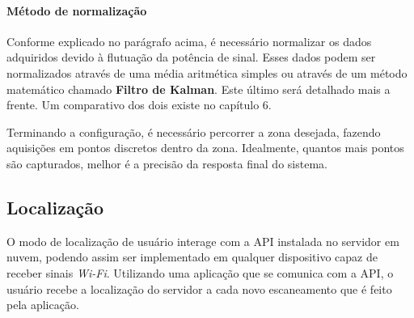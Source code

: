 \paragraph{Método de normalização\\}
Conforme explicado no parágrafo acima, é necessário normalizar os dados adquiridos devido à flutuação da potência de sinal. Esses dados podem ser normalizados através de uma média aritmética simples ou através de um método matemático chamado \textbf{Filtro de Kalman}. Este último será detalhado mais a frente. Um comparativo dos dois existe no capítulo 6.
\par

Terminando a configuração, é necessário percorrer a zona desejada, fazendo aquisições em pontos discretos dentro da zona. Idealmente, quantos mais pontos são capturados, melhor é a precisão da resposta final do sistema.

\subsection{Localização}
O modo de localização de usuário interage com a API instalada no servidor em nuvem, podendo assim ser implementado em qualquer dispositivo capaz de receber sinais \textit{Wi-Fi}. Utilizando uma aplicação que se comunica com a API, o usuário recebe a localização do servidor a cada novo escaneamento que é feito pela aplicação.

